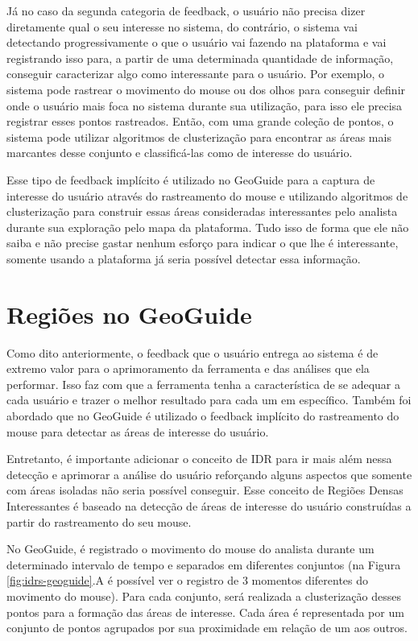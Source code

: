 Já no caso da segunda categoria de feedback, o usuário não precisa dizer diretamente qual o seu interesse no sistema, do contrário, o sistema vai detectando progressivamente o que o usuário vai fazendo na plataforma e vai registrando isso para, a partir de uma determinada quantidade de informação, conseguir caracterizar algo como interessante para o usuário. Por exemplo, o sistema pode rastrear o movimento do mouse ou dos olhos para conseguir definir onde o usuário mais foca no sistema durante sua utilização, para isso ele precisa registrar esses pontos rastreados. Então, com uma grande coleção de pontos, o sistema pode utilizar algoritmos de clusterização para encontrar as áreas mais marcantes desse conjunto e classificá-las como de interesse do usuário.

Esse tipo de feedback implícito é utilizado no GeoGuide para a captura de interesse do usuário através do rastreamento do mouse e utilizando algoritmos de clusterização para construir essas áreas consideradas interessantes pelo analista durante sua exploração pelo mapa da plataforma. Tudo isso de forma que ele não saiba e não precise gastar nenhum esforço para indicar o que lhe é interessante, somente usando a plataforma já seria possível detectar essa informação.

\section{Regiões no GeoGuide}

Como dito anteriormente, o feedback que o usuário entrega ao sistema é de extremo valor para o aprimoramento da ferramenta e das análises que ela performar. Isso faz com que a ferramenta tenha a característica de se adequar a cada usuário e trazer o melhor resultado para cada um em específico. Também foi abordado que no GeoGuide é utilizado o feedback implícito do rastreamento do mouse para detectar as áreas de interesse do usuário.

Entretanto, é importante adicionar o conceito de IDR para ir mais além nessa detecção e aprimorar a análise do usuário reforçando alguns aspectos que somente com áreas isoladas não seria possível conseguir. Esse conceito de Regiões Densas Interessantes é baseado na detecção de áreas de interesse do usuário construídas a partir do rastreamento do seu mouse.

No GeoGuide, é registrado o movimento do mouse do analista durante um determinado intervalo de tempo e separados em diferentes conjuntos (na Figura \ref{fig:idrs-geoguide}.A é possível ver o registro de 3 momentos diferentes do movimento do mouse). Para cada conjunto, será realizada a clusterização desses pontos para a formação das áreas de interesse. Cada área é representada por um conjunto de pontos agrupados por sua proximidade em relação de um aos outros.


